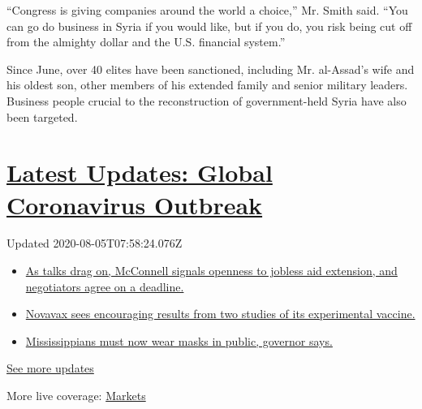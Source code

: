 ``Congress is giving companies around the world a choice,'' Mr. Smith
said. ``You can go do business in Syria if you would like, but if you
do, you risk being cut off from the almighty dollar and the U.S.
financial system.''

Since June, over 40 elites have been sanctioned, including Mr.
al-Assad's wife and his oldest son, other members of his extended family
and senior military leaders. Business people crucial to the
reconstruction of government-held Syria have also been targeted.

\hypertarget{latest-updates-global-coronavirus-outbreak}{%
\section{\texorpdfstring{\href{https://www.nytimes.com/2020/08/04/world/coronavirus-cases.html?action=click\&pgtype=Article\&state=default\&region=MAIN_CONTENT_1\&context=storylines_live_updates}{Latest
Updates: Global Coronavirus
Outbreak}}{Latest Updates: Global Coronavirus Outbreak}}\label{latest-updates-global-coronavirus-outbreak}}

Updated 2020-08-05T07:58:24.076Z

\begin{itemize}
\tightlist
\item
  \href{https://www.nytimes.com/2020/08/04/world/coronavirus-cases.html?action=click\&pgtype=Article\&state=default\&region=MAIN_CONTENT_1\&context=storylines_live_updates\#link-762df92}{As
  talks drag on, McConnell signals openness to jobless aid extension,
  and negotiators agree on a deadline.}
\item
  \href{https://www.nytimes.com/2020/08/04/world/coronavirus-cases.html?action=click\&pgtype=Article\&state=default\&region=MAIN_CONTENT_1\&context=storylines_live_updates\#link-1228a480}{Novavax
  sees encouraging results from two studies of its experimental
  vaccine.}
\item
  \href{https://www.nytimes.com/2020/08/04/world/coronavirus-cases.html?action=click\&pgtype=Article\&state=default\&region=MAIN_CONTENT_1\&context=storylines_live_updates\#link-794484ed}{Mississippians
  must now wear masks in public, governor says.}
\end{itemize}

\href{https://www.nytimes.com/2020/08/04/world/coronavirus-cases.html?action=click\&pgtype=Article\&state=default\&region=MAIN_CONTENT_1\&context=storylines_live_updates}{See
more updates}

More live coverage:
\href{https://www.nytimes.com/live/2020/08/04/business/stock-market-today-coronavirus?action=click\&pgtype=Article\&state=default\&region=MAIN_CONTENT_1\&context=storylines_live_updates}{Markets}

